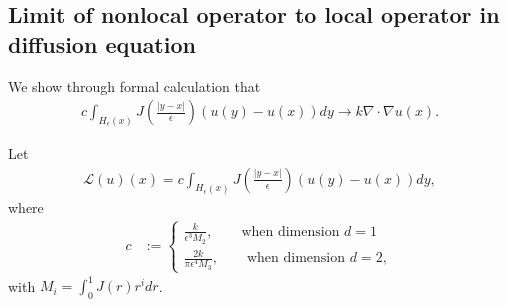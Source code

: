 \documentclass[11pt,twocolumn]{amsart}
\theoremstyle{definition}
\theoremstyle{definition}
\numberwithin{equation}{section}
\numberwithin{equation}{section}
\newcommand{\calL}{\mathcal{L}}  %
\begin{document}
\begin{appendices}
\section{Limit of nonlocal operator to local operator in diffusion equation}\label{s:converge}
We show through formal calculation that 
\begin{align*}
c \int_{H_\epsilon(x)}  J(\frac{|y-x|}{\epsilon}) (u(y) - u(x)) dy \to k \nabla \cdot \nabla u(x).
\end{align*}

Let 
\begin{align}\label{eq:opL}
\calL(u)(x) = c \int_{H_\epsilon(x)}  J(\frac{|y-x|}{\epsilon}) (u(y) - u(x)) dy,
\end{align}
where 
\begin{align}\label{eq:constc 2}
c &:= \begin{cases}
\frac{k}{\epsilon^3 M_2}, \qquad \text{when dimension }d=1 \\
\frac{2k}{\pi\epsilon^4 M_3}, \qquad \text{when dimension }d=2,
\end{cases}
\end{align}
with $M_i = \int_0^1 J(r) r^i dr$. 


\end{appendices}
\end{document}
